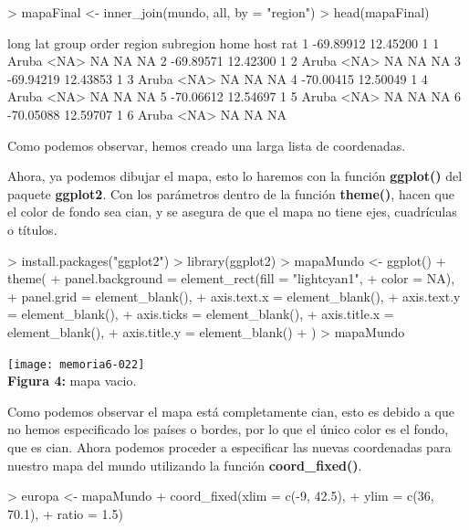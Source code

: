 \documentclass [a4paper] {article}
\begin{document}
\begin{Schunk}
\begin{Sinput}
> mapaFinal <- inner_join(mundo, all, by = "region")
> head(mapaFinal)
\end{Sinput}
\begin{Soutput}
       long      lat group order region subregion home host rat
1 -69.89912 12.45200     1     1  Aruba      <NA>   NA   NA  NA
2 -69.89571 12.42300     1     2  Aruba      <NA>   NA   NA  NA
3 -69.94219 12.43853     1     3  Aruba      <NA>   NA   NA  NA
4 -70.00415 12.50049     1     4  Aruba      <NA>   NA   NA  NA
5 -70.06612 12.54697     1     5  Aruba      <NA>   NA   NA  NA
6 -70.05088 12.59707     1     6  Aruba      <NA>   NA   NA  NA
\end{Soutput}
\end{Schunk}

Como podemos observar, hemos creado una larga lista de coordenadas.

Ahora, ya podemos dibujar el mapa, esto lo haremos con la función \textbf{ggplot()} del
paquete \textbf{ggplot2}. Con los parámetros dentro de la función \textbf{theme()}, hacen
que el color de fondo sea cian, y se asegura de que el mapa no tiene ejes, cuadrículas o títulos.

\begin{center}
\begin{Schunk}
\begin{Sinput}
> install.packages("ggplot2")
> library(ggplot2)
> mapaMundo <- ggplot() + theme(
+   panel.background = element_rect(fill = "lightcyan1",
+                                   color = NA),
+   panel.grid = element_blank(),
+   axis.text.x = element_blank(),
+   axis.text.y = element_blank(),
+   axis.ticks = element_blank(),
+   axis.title.x = element_blank(),
+   axis.title.y = element_blank()
+ )
> mapaMundo
\end{Sinput}
\end{Schunk}
\texttt{[image: memoria6-022]}
\\\textbf{Figura 4:} mapa vacio.
\end{center}

Como podemos observar el mapa está completamente cian, esto es debido a que no hemos 
especificado los países o bordes, por lo que el único color es el fondo, que es cian.
Ahora podemos proceder a especificar las nuevas coordenadas para nuestro mapa del mundo 
utilizando la función \textbf{coord\_fixed()}.

\begin{Schunk}
\begin{Sinput}
> europa <- mapaMundo + coord_fixed(xlim = c(-9, 42.5),
+                                  ylim = c(36, 70.1),
+                                  ratio = 1.5)
\end{Sinput}
\end{Schunk}
\end{document}
